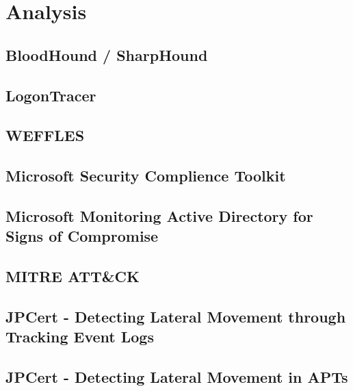 \section{Analysis}

\subsection{BloodHound / SharpHound}

\subsection{LogonTracer}

\subsection{WEFFLES}

\subsection{Microsoft Security Complience Toolkit}

\subsection{Microsoft Monitoring Active Directory for Signs of Compromise}

\subsection{MITRE ATT\&CK}

\subsection{JPCert - Detecting Lateral Movement through Tracking Event Logs}

\subsection{JPCert - Detecting Lateral Movement in APTs}

